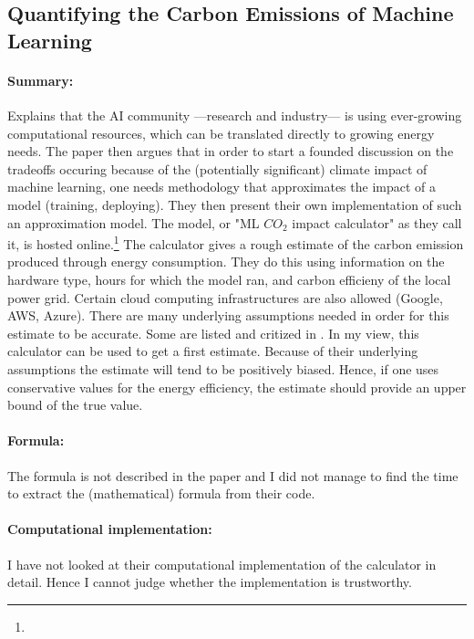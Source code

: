\documentclass[a4paper, 12pt]{article}
\begin{document}
\subsection{Quantifying the Carbon Emissions of Machine Learning}
\centerline{}
\vspace{1em}

\paragraph{Summary:} Explains that the AI community ---research and industry--- is using
ever-growing computational resources, which can be translated directly to growing energy
needs. The paper then argues that in order to start a founded discussion on the
tradeoffs occuring because of the (potentially significant) climate impact of machine
learning, one needs methodology that approximates the impact of a model (training,
deploying). They then present their own implementation of such an approximation model.
The model, or "ML $CO_2$ impact calculator" as they call it, is hosted
online.\footnote{} The calculator gives a rough
estimate of the carbon emission produced through energy consumption. They do this using
information on the hardware type, hours for which the model ran, and carbon efficieny of
the local power grid. Certain cloud computing infrastructures are also allowed (Google,
AWS, Azure). There are many underlying assumptions needed in order for this estimate to
be accurate. Some are listed and critized in . In my view, this
calculator can be used to get a first estimate. Because of their underlying assumptions
the estimate will tend to be positively biased. Hence, if one uses conservative values
for the energy efficiency, the estimate should provide an upper bound of the true value.

\paragraph{Formula:} The formula is not described in the paper and I did not manage to
find the time to extract the (mathematical) formula from their code.

\paragraph{Computational implementation:} I have not looked at their computational
implementation of the calculator in detail. Hence I cannot judge whether the
implementation is trustworthy.
\end{document}
